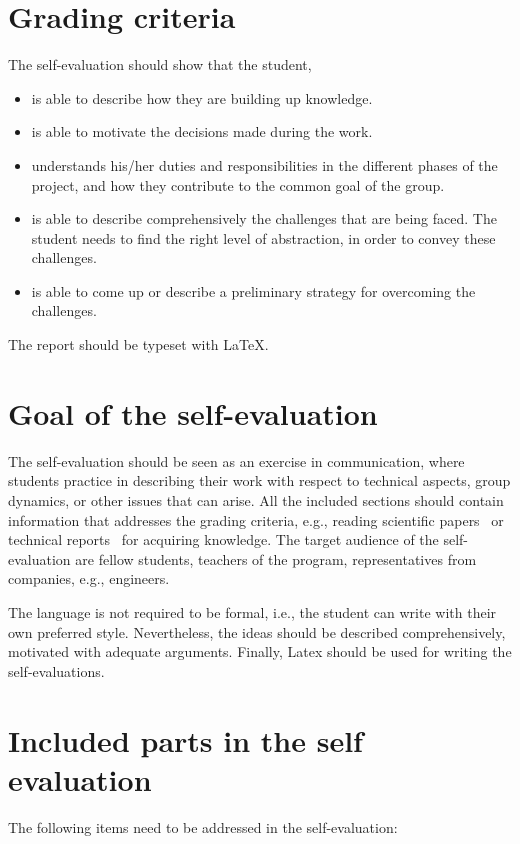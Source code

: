 \documentclass{article}
\begin{document}
\section*{Grading criteria}
The self-evaluation should show that the student,
\begin{itemize}
    \item is able to describe how they are building up knowledge.
    \item is able to motivate the decisions made during the work.

    \item understands his/her duties and responsibilities in the different phases of the project, and how they contribute to the common goal of the group. 
    \item is able to describe comprehensively the challenges that are being faced. The student needs to find the right level of abstraction, in order to convey these challenges.
    \item is able to come up or describe a preliminary strategy for overcoming the challenges. 

\end{itemize}
The report should be typeset with \LaTeX.

\section*{Goal of the self-evaluation}
The self-evaluation should be seen as an exercise in communication, where students practice in describing their work with respect to technical aspects, group dynamics, or other issues that can arise. All the included sections should contain information that addresses the grading criteria, e.g., reading scientific papers~\cite{Ekstrom20011845221} or technical reports~\cite{thruster} for acquiring knowledge. The target audience of the self-evaluation are fellow students, teachers of the program, representatives from companies, e.g., engineers. 

The language is not required to be formal, i.e., the student can write with their own preferred style. Nevertheless, the ideas should be described comprehensively, motivated with adequate arguments. Finally, Latex should be used for writing the self-evaluations. 
\section*{Included parts in the self evaluation}
The following items need to be addressed in the self-evaluation:
\end{document}
